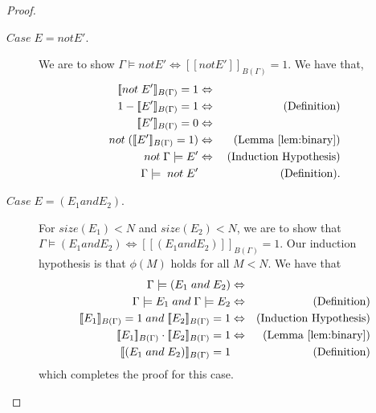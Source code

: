 \documentclass[acmsmall, review, anonymous]{acmart}\settopmatter{printfolios=true,printccs=false,printacmref=false}
\newcommand{\qqpi}[2]{[\![#2]\!]_{#1}}
\begin{document}
\begin{proof}
\begin{description}
     \item[$Case \; E ={} \mathrel{not} E'$.]
                  We are to show
                  $\Gamma \models{} \mathrel{not} E' \Leftrightarrow \qqpi{B(\Gamma)}{\mathrel{not} E'} = 1$.
                  We have that,
                  \begin{align*}
                        \qqpi{B(\Gamma)}{\mathrel{not} E'} = 1 & \Leftrightarrow{} &  \\
                        1- \qqpi{B(\Gamma)}{E'} = 1 & \Leftrightarrow{} & \text{(Definition)}  \\
                        \qqpi{B(\Gamma)}{E'} = 0 & \Leftrightarrow{} &  \\
                        \mathrel{not} (\qqpi{B(\Gamma)}{E'} = 1) & \Leftrightarrow{} & \text{(Lemma~\ref{lem:binary})} \\
                        \mathrel{not}  \Gamma \models{}  E'
                        & \Leftrightarrow{} & \text{(Induction Hypothesis)} \\
                         \Gamma \models{} \mathrel{not} E' & & \text{(Definition)}.
                  \end{align*}
          
          \item[$Case \; E = (E_1 \mathrel{and} E_2)$.] 
                  For $size(E_1)<N$ and $size(E_2) < N$, we are to show that
                  $\Gamma \models (E_1 \mathrel{and} E_2) \Leftrightarrow \qqpi{B(\Gamma)}{(E_1 \mathrel{and} E_2)} = 1$. Our induction hypothesis is that $\phi(M)$ holds for all $M<N$. We have that
                  \begin{align*}
                      \Gamma \models (E_1 \mathrel{and} E_2)                            & \Leftrightarrow &  \\
                      \Gamma \models E_1 \mathrel{and} \Gamma \models E_2               & \Leftrightarrow & \text{(Definition)}  \\
                      \qqpi{B(\Gamma)}{E_1} = 1 \mathrel{and} \qqpi{B(\Gamma)}{E_2} = 1 & \Leftrightarrow & \text{(Induction Hypothesis)}           \\
                      \qqpi{B(\Gamma)}{E_1} \cdot \qqpi{B(\Gamma)}{E_2} = 1             & \Leftrightarrow &  \text{(Lemma~\ref{lem:binary})}           \\                 
                      \qqpi{B(\Gamma)}{(E_1 \mathrel{and} E_2)} = 1                  &   &  \text{(Definition)}                                         \\
                  \end{align*}
                  which completes the proof for this case.


\end{description}
\end{proof}
\end{document}
